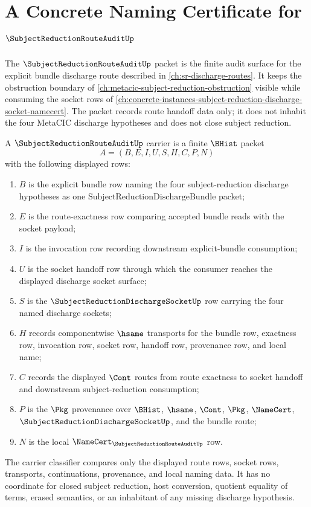 \chapter{A Concrete Naming Certificate for $\SubjectReductionRouteAuditUp$}
\label{ch:concrete-instances-subject-reduction-route-audit-namecert}

The $\SubjectReductionRouteAuditUp$ packet is the finite audit surface for
the explicit bundle discharge route described in \autoref{ch:sr-discharge-routes}.
It keeps the obstruction boundary of
\autoref{ch:metacic-subject-reduction-obstruction} visible while consuming
the socket rows of
\autoref{ch:concrete-instances-subject-reduction-discharge-socket-namecert}.
The packet records route handoff data only; it does not inhabit the four
MetaCIC discharge hypotheses and does not close subject reduction.

\begin{definition}
\label{def:subject-reduction-route-audit-carrier}
A $\SubjectReductionRouteAuditUp$ carrier is a finite $\BHist$ packet
$$
A=(B,E,I,U,S,H,C,P,N)
$$
with the following displayed rows:
\begin{enumerate}
\item $B$ is the explicit bundle row naming the four subject-reduction discharge hypotheses as one $\mathrm{SubjectReductionDischargeBundle}$ packet;
\item $E$ is the route-exactness row comparing accepted bundle reads with the socket payload;
\item $I$ is the invocation row recording downstream explicit-bundle consumption;
\item $U$ is the socket handoff row through which the consumer reaches the displayed discharge socket surface;
\item $S$ is the $\SubjectReductionDischargeSocketUp$ row carrying the four named discharge sockets;
\item $H$ records componentwise $\hsame$ transports for the bundle row, exactness row, invocation row, socket row, handoff row, provenance row, and local name;
\item $C$ records the displayed $\Cont$ routes from route exactness to socket handoff and downstream subject-reduction consumption;
\item $P$ is the $\Pkg$ provenance over $\BHist$, $\hsame$, $\Cont$, $\Pkg$, $\NameCert$, $\SubjectReductionDischargeSocketUp$, and the bundle route;
\item $N$ is the local $\NameCert_{\SubjectReductionRouteAuditUp}$ row.
\end{enumerate}
The carrier classifier compares only the displayed route rows, socket rows,
transports, continuations, provenance, and local naming data. It has no
coordinate for closed subject reduction, host conversion, quotient equality of
terms, erased semantics, or an inhabitant of any missing discharge hypothesis.
\end{definition}


